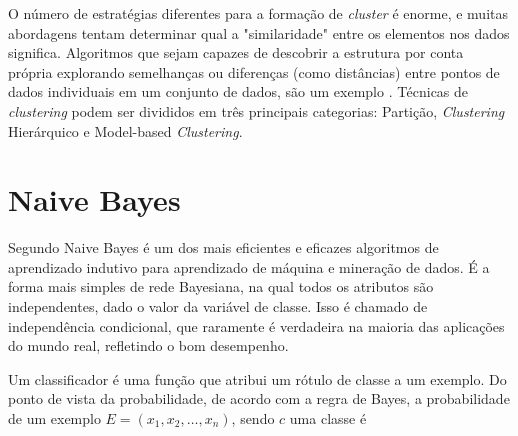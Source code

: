 O número de estratégias diferentes para a formação de \textit{cluster} é enorme, e muitas abordagens tentam determinar qual a "similaridade" entre os elementos nos dados significa. Algoritmos que sejam capazes de descobrir a estrutura por conta própria explorando semelhanças ou diferenças (como distâncias) entre pontos de dados individuais em um conjunto de dados, são um exemplo \cite{cios2007}. Técnicas de \textit{clustering} podem ser divididos em três principais categorias: Partição, \textit{Clustering} Hierárquico e Model-based \textit{Clustering}.



\section{Naive Bayes}


Segundo \cite{zhang2004} Naive Bayes é um dos mais eficientes e eficazes algoritmos de aprendizado indutivo para aprendizado de máquina e mineração de dados. É a forma mais simples de rede Bayesiana, na qual todos os atributos são independentes, dado o valor da variável de classe. Isso é chamado de independência condicional, que raramente é verdadeira na maioria das aplicações do mundo real, refletindo o bom desempenho.






Um classificador é uma função que atribui um rótulo de classe a um exemplo. Do ponto de vista da probabilidade, de acordo com a regra de Bayes, a probabilidade de um exemplo $E = (x_1, x_2, \dots, x_n)$, sendo $c$ uma classe é


